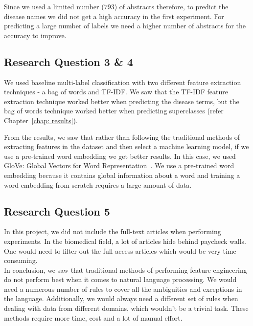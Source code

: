 Since we used a limited number (793) of abstracts therefore, to predict the disease names we did not get a high accuracy in the first experiment. For predicting a large number of labels we need a higher number of abstracts for the accuracy to improve. 

\subsection{Research Question 3 \& 4}
We used baseline multi-label classification with two different feature extraction techniques - a bag of words and TF-IDF. We saw that the TF-IDF feature extraction technique worked better when predicting the disease terms, but the bag of words technique worked better when predicting superclasses (refer Chapter~\ref{chap: results}). 

From the results, we saw that rather than following the traditional methods of extracting features in the dataset and then select a machine learning model, if we use a pre-trained word embedding we get better results. In this case, we used GloVe: Global Vectors for Word Representation~\cite{pennington2014glove}. We use a pre-trained word embedding because it contains global information about a word and training a word embedding from scratch requires a large amount of data. 

\subsection{Research Question 5}
In this project, we did not include the full-text articles when performing experiments. In the biomedical field, a lot of articles hide behind paycheck walls. One would need to filter out the full access articles which would be very time consuming.  
\\

In conclusion, we saw that traditional methods of performing feature engineering do not perform best when it comes to natural language processing. We would need a numerous number of rules to cover all the ambiguities and exceptions in the language. 
Additionally, we would always need a different set of rules when dealing with data from different domains, which wouldn't be a trivial task. These methods require more time, cost and a lot of manual effort. 

